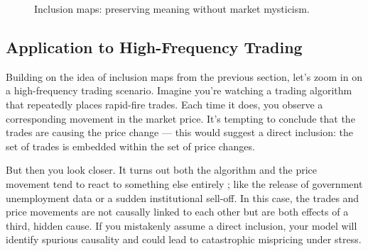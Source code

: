 \begin{figure}[H]
\centering
{}
\caption{Inclusion maps: preserving meaning without market mysticism.}
\end{figure}







\subsection{Application to High-Frequency Trading}

\vspace{0.5em}
\noindent
Building on the idea of inclusion maps from the previous section, let’s zoom in on a high-frequency trading scenario. Imagine you’re watching a trading algorithm that repeatedly places rapid-fire trades. Each time it does, you observe a corresponding movement in the market price. It’s tempting to conclude that the trades are causing the price change — this would suggest a direct inclusion: the set of trades is embedded within the set of price changes.

But then you look closer. It turns out both the algorithm and the price movement tend to react to something else entirely ; like the release of government unemployment data or a sudden institutional sell-off. In this case, the trades and price movements are not causally linked to each other but are both effects of a third, hidden cause. If you mistakenly assume a direct inclusion, your model will identify spurious causality and could lead to catastrophic mispricing under stress.

